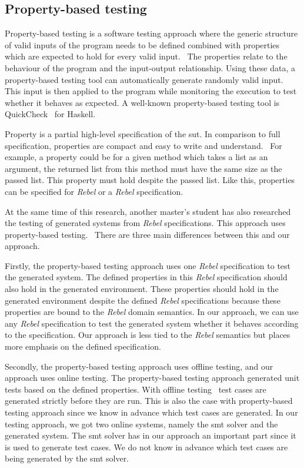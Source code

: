 \subsection*{Property-based testing}

Property-based testing is a software testing approach where the generic
structure of valid inputs of the program needs to be defined combined with
properties which are expected to hold for every valid
input.~\cite[p.~3]{papadakis2011proper} The properties relate to the behaviour
of the program and the input-output relationship. Using these data, a
property-based testing tool can automatically generate randomly valid input.
This input is then applied to the program while monitoring the execution to
test whether it behaves as expected. A well-known property-based testing tool is
QuickCheck~\cite{claessen2011quickcheck} for Haskell.

Property is a partial high-level specification of the \gls{sut}. In comparison
to full specification, properties are compact and easy to write and
understand.~\cite[p.~3]{papadakis2011proper} For example, a property could be
for a given method which takes a list as an argument, the returned list from
this method must have the same size as the passed list. This property must hold
despite the passed list. Like this, properties can be specified for
\textit{Rebel} or a \textit{Rebel} specification.

At the same time of this research, another master's student has also researched
the testing of generated systems from \textit{Rebel} specifications.
This approach uses property-based testing.~\cite{kok2017property}
There are three main differences between this and our approach.

Firstly, the property-based testing approach uses one \textit{Rebel}
specification to test the generated system. The defined properties in this
\textit{Rebel} specification should also hold in the generated environment.
These properties should hold in the generated environment despite the defined
\textit{Rebel} specifications because these properties are bound to the
\textit{Rebel} domain semantics. In our approach, we can use any \textit{Rebel}
specification to test the generated system whether it behaves according to the
specification. Our approach is less tied to the \textit{Rebel} semantics but
places more emphasis on the defined specification.

Secondly, the property-based testing approach uses offline testing, and our
approach uses online testing. The property-based testing approach generated unit
tests based on the defined properties.
With offline testing~\cite{utting2012taxonomy} test cases are generated strictly
before they are run. This is also the case with property-based testing approach
since we know in advance which test cases are generated.
In our testing approach, we got two online systems, namely the \gls{smt} solver
and the generated system. The \gls{smt} solver has in our approach an important
part since it is used to generate test cases. We do not know in advance which
test cases are being generated by the \gls{smt} solver.

